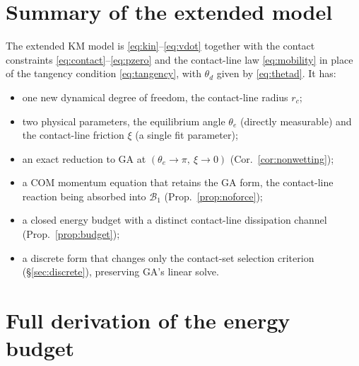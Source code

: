 \documentclass{jfm}
\begin{document}
\section{Summary of the extended model}\label{sec:summary}

The extended KM model is \eqref{eq:kin}--\eqref{eq:vdot} together with the contact
constraints \eqref{eq:contact}--\eqref{eq:pzero} and the contact-line law
\eqref{eq:mobility} in place of the tangency condition \eqref{eq:tangency}, with
$\theta_d$ given by \eqref{eq:thetad}. It has:
\begin{itemize}
\item one new dynamical degree of freedom, the contact-line radius $r_c$;
\item two physical parameters, the equilibrium angle $\theta_e$ (directly measurable)
      and the contact-line friction $\xi$ (a single fit parameter);
\item an exact reduction to GA at $(\theta_e\to\pi,\ \xi\to0)$
      (Cor.~\ref{cor:nonwetting});
\item a COM momentum equation that retains the GA form, the contact-line reaction being
      absorbed into $\mathscr B_1$ (Prop.~\ref{prop:noforce});
\item a closed energy budget with a distinct contact-line dissipation channel
      (Prop.~\ref{prop:budget});
\item a discrete form that changes only the contact-set selection criterion
      (\S\ref{sec:discrete}), preserving GA's linear solve.
\end{itemize}

\appendix

\section{Full derivation of the energy budget}\label{app:budget}
\end{document}
